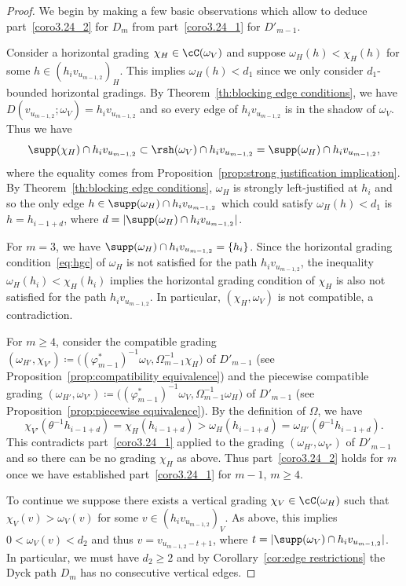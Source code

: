\begin{proof}
 We begin by making a few basic observations which allow to deduce part~\ref{coro3.24_2} for $D_m$ from part~\ref{coro3.24_1} for $D'_{m-1}$.
 
 Consider a horizontal grading $\chi_H\in\cC(\omega_V)$ and suppose $\omega_H(h)<\chi_H(h)$ for some $h\in(h_iv_{u_{m-1,2}})_H$.
 This implies $\omega_H(h)<d_1$ since we only consider $d_1$-bounded horizontal gradings.
 By Theorem~\ref{th:blocking edge conditions}, we have $D(v_{u_{m-1,2}};\omega_V)=h_iv_{u_{m-1,2}}$ and so every edge of $h_iv_{u_{m-1,2}}$ is in the shadow of $\omega_V$.
 Thus we have 
 \[\supp(\chi_H)\cap h_iv_{u_{m-1,2}}\subset\rsh(\omega_V)\cap h_iv_{u_{m-1,2}}=\supp(\omega_H)\cap h_iv_{u_{m-1,2}},\]
 where the equality comes from Proposition~\ref{prop:strong justification implication}.
 By Theorem~\ref{th:blocking edge conditions}, $\omega_H$ is strongly left-justified at $h_i$ and so the only edge $h\in\supp(\omega_H)\cap h_iv_{u_{m-1,2}}$ which could satisfy $\omega_H(h)<d_1$ is $h=h_{i-1+d}$, where $d=|\supp(\omega_H)\cap h_iv_{u_{m-1,2}}|$.

 For $m=3$, we have $\supp(\omega_H)\cap h_iv_{u_{m-1,2}}=\{h_i\}$.
 Since the horizontal grading condition~\eqref{eq:hgc} of $\omega_H$ is not satisfied for the path $h_iv_{u_{m-1,2}}$, the inequality $\omega_H(h_i)<\chi_H(h_i)$ implies the horizontal grading condition of $\chi_H$ is also not satisfied for the path $h_iv_{u_{m-1,2}}$.
 In particular, $(\chi_H,\omega_V)$ is not compatible, a contradiction. 
 
 For $m\ge4$, consider the compatible grading $(\omega_{H'},\chi_{V'})\coloneqq \big((\varphi^*_{m-1})^{-1}\omega_V,\Omega_{m-1}^{-1}\chi_H\big)$ of $D'_{m-1}$ (see Proposition~\ref{prop:compatibility equivalence}) and the piecewise compatible grading $(\omega_{H'},\omega_{V'})\coloneqq \big((\varphi^*_{m-1})^{-1}\omega_V,\Omega_{m-1}^{-1}\omega_H\big)$ of $D'_{m-1}$ (see Proposition~\ref{prop:piecewise equivalence}).
 By the definition of $\Omega$, we have
 \[\chi_{V'}(\theta^{-1}h_{i-1+d})=\chi_H(h_{i-1+d})>\omega_H(h_{i-1+d})=\omega_{H'}(\theta^{-1}h_{i-1+d}).\]
 This contradicts part~\ref{coro3.24_1} applied to the grading $(\omega_{H'},\omega_{V'})$ of $D'_{m-1}$ and so there can be no grading $\chi_H$ as above.
 Thus part~\ref{coro3.24_2} holds for $m$ once we have established part~\ref{coro3.24_1} for $m-1$, $m\ge4$.

 To continue we suppose there exists a vertical grading $\chi_V\in\cC(\omega_H)$ such that $\chi_V(v)>\omega_V(v)$ for some $v\in(h_iv_{u_{m-1,2}})_V$.
 As above, this implies $0<\omega_V(v)<d_2$ and thus $v=v_{u_{m-1,2}-t+1}$, where $t=|\supp(\omega_V)\cap h_iv_{u_{m-1,2}}|$.
 In particular, we must have $d_2\ge2$ and by Corollary~\ref{cor:edge restrictions} the Dyck path $D_m$ has no consecutive vertical edges.
 

\end{proof}
